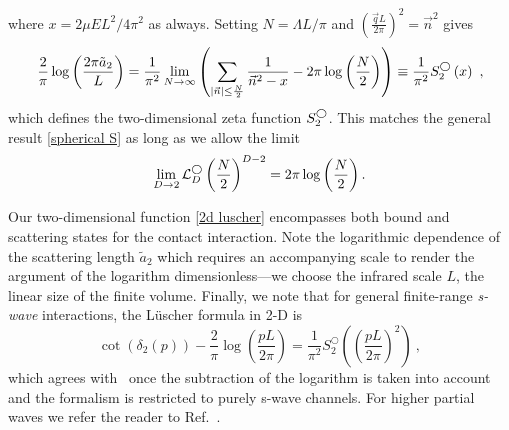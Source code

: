 where $x=2\mu EL^2/4\pi^2$ as always.
Setting $N=\Lambda L/\pi$ and $\left(\frac{\vec{q}L}{2\pi}\right)^2=\vec{n}^2$ gives
\begin{equation}
    \frac{2}{\pi} \log \left(\frac{2\pi \tilde a_{2}}{L}\right)
    =
    \frac{1}{\pi^2}
    \lim_{N\to\infty}
    \left(
        \sum_{|\vec{n}|\le \frac{N}{2}} \frac{1}{\vec{n}^2-x}
        -2\pi \log \left(\frac{N}{2}\right)
    \right)
    \equiv
    \frac{1}{\pi^2}S^{\bigcirc}_2\left(x\right)\ ,\label{eq:2d luscher}
\end{equation}
which defines the two-dimensional zeta function $S^{\bigcirc}_2$.
This matches the general result \eqref{spherical S} as long as we allow the limit
\begin{equation}
    \lim_{D\to2}\mathcal{L}_D^\bigcirc \left(\frac{N}{2}\right)^{D-2}=2\pi \log \left(\frac{N}{2}\right).
\end{equation}

Our two-dimensional \Luscher function \eqref{2d luscher} encompasses both bound and scattering states for the contact interaction.
Note the logarithmic dependence of the scattering length $\tilde a_{2}$ which requires an accompanying scale to render the argument of the logarithm dimensionless---we choose the infrared scale $L$, the linear size of the finite volume.
Finally, we note that for general finite-range \emph{s-wave} interactions, the L\"uscher formula in 2-D is
\begin{equation}\label{eq:full 2d luescher}
\cot(\delta_{2}(p))-\frac{2}{\pi}\log\left(\frac{pL}{2\pi}\right) = \frac{1}{\pi^2}S^\bigcirc_2\left(\left(\frac{pL}{2\pi}\right)^2\right)\ ,
\end{equation}
which agrees with~\cite{Zhu:2019dho,Fiebig:1994qi} once the subtraction of the logarithm is taken into account and the formalism is restricted to purely s-wave channels.  For higher partial waves we refer the reader to Ref.~\cite{Fiebig:1994qi}.




